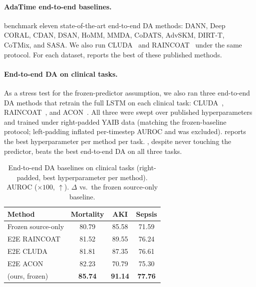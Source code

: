 \paragraph{AdaTime end-to-end baselines.}
\citet{ragab2023adatime} benchmark eleven state-of-the-art end-to-end DA methods: DANN, Deep CORAL, CDAN, DSAN, HoMM, MMDA, CoDATS, AdvSKM, DIRT-T, CoTMix, and SASA. We also run CLUDA~\citep{ozyurt2023cluda} and RAINCOAT~\citep{he2023raincoat} under the same protocol. For each dataset,  reports the best of these published methods.

\paragraph{End-to-end DA on clinical tasks.}
As a stress test for the frozen-predictor assumption, we also ran three end-to-end DA methods that retrain the full LSTM on each clinical task: CLUDA~\citep{ozyurt2023cluda}, RAINCOAT~\citep{he2023raincoat}, and ACON~\citep{liu2024acon}. All three were swept over published hyperparameters and trained under right-padded YAIB data (matching the frozen-baseline protocol; left-padding inflated per-timestep AUROC and was excluded).  reports the best hyperparameter per method per task. \retr{}, despite never touching the predictor, beats the best end-to-end DA on all three tasks.

\begin{table}[h]
\centering
\caption{End-to-end DA baselines on clinical tasks (right-padded, best hyperparameter per method). AUROC ($\times 100$, $\uparrow$). $\Delta$ vs.\ the frozen source-only baseline.}
\label{tab:e2e-clinical}
\footnotesize
\begin{tabular}{@{}l ccc@{}}
\toprule
\textbf{Method} & \textbf{Mortality} & \textbf{AKI} & \textbf{Sepsis} \\
\midrule
Frozen source-only            & 80.79 & 85.58 & 71.59 \\
\midrule
E2E RAINCOAT                   & 81.52 & 89.55 & 76.24 \\
E2E CLUDA                      & 81.81 & 87.35 & 76.61 \\
E2E ACON                       & 82.23 & 70.79 & 75.30 \\
\midrule
\retr{} (ours, frozen)         & \textbf{85.74} & \textbf{91.14} & \textbf{77.76} \\
\bottomrule
\end{tabular}
\end{table}


